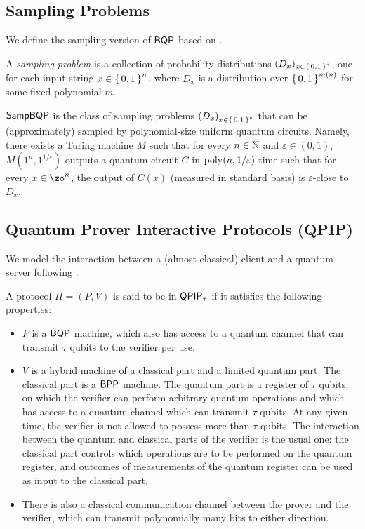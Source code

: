 \subsection{Sampling Problems}

We define the sampling version of $\operatorname{\mathsf{BQP}}$ based on \cite{aaronson_2013}.

\begin{definition} 
	A \emph{sampling problem} is a collection of probability distributions $(D_x)_{x\in\set{0, 1}^*}$, one for each input string $x\in\set{0,1}^n$, where $D_x$ is a distribution over $\set{0,1}^{m(n)}$ for some fixed polynomial $m$.
\end{definition}

\begin{definition} [$\SampBQP$]
	$\SampBQP$ is the class of sampling problems $\left(D_x\right)_{x\in\set{0, 1}^*}$ that can be (approximately) sampled by polynomial-size uniform quantum circuits. Namely, there exists a Turing machine $M$ such that for every $n \in \mathbb{N}$ and $\varepsilon \in (0,1)$, $M(1^n, 1^{1/\varepsilon})$ outputs a quantum circuit $C$ in $\operatorname*{\operatorname{poly}}(n, 1/\varepsilon)$ time such that for every $x \in \zo^n$, the output of $C(x)$ (measured in standard basis) is $\varepsilon$-close to $D_x$.
\end{definition}

\subsection{Quantum Prover Interactive Protocols (QPIP)}


We model the interaction between a (almost classical) client and a quantum server following \cite{FOCS:Mahadev18a}.

\begin{definition}
	A protocol $\Pi=(P, V)$ is said to be in $\operatorname{\mathsf{QPIP}}_\tau$ if it satisfies the following properties:
	\begin{itemize}
		\item $P$ is a $\operatorname{\mathsf{BQP}}$ machine, which also has access to a quantum channel that can transmit $\tau$ qubits to the verifier per use.
		\item $V$ is a hybrid machine of a classical part and a limited quantum part. The classical part is a $\operatorname{\mathsf{BPP}}$ machine. The quantum part is a register of $\tau$ qubits, on which the verifier can perform arbitrary quantum operations and which has access to a quantum channel which can transmit $\tau$ qubits. At any given time, the verifier is not allowed to possess more than $\tau$ qubits. The interaction between the quantum and classical parts of the verifier is the usual one: the classical part controls which operations are to be performed on the quantum register, and outcomes of measurements of the quantum register can be used as input to the classical part.
		\item There is also a classical communication channel between the prover and the verifier, which can transmit polynomially many bits to either direction.
	\end{itemize}
\end{definition}

